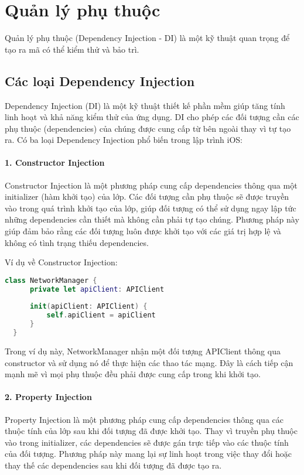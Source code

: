 \section{Quản lý phụ thuộc}
Quản lý phụ thuộc (Dependency Injection - DI) là một kỹ thuật quan trọng để tạo ra mã có thể kiểm thử và bảo trì.

\subsection{Các loại Dependency Injection}

Dependency Injection (DI) là một kỹ thuật thiết kế phần mềm giúp tăng tính linh hoạt và khả năng kiểm thử của ứng dụng. DI cho phép các đối tượng cần các phụ thuộc (dependencies) của chúng được cung cấp từ bên ngoài thay vì tự tạo ra. Có ba loại Dependency Injection phổ biến trong lập trình iOS:

\paragraph*{1. Constructor Injection}
Constructor Injection là một phương pháp cung cấp dependencies thông qua một initializer (hàm khởi tạo) của lớp. Các đối tượng cần phụ thuộc sẽ được truyền vào trong quá trình khởi tạo của lớp, giúp đối tượng có thể sử dụng ngay lập tức những dependencies cần thiết mà không cần phải tự tạo chúng. Phương pháp này giúp đảm bảo rằng các đối tượng luôn được khởi tạo với các giá trị hợp lệ và không có tình trạng thiếu dependencies.

Ví dụ về Constructor Injection:

\begin{lstlisting}[language=Swift]
  class NetworkManager {
      private let apiClient: APIClient
  
      init(apiClient: APIClient) {
          self.apiClient = apiClient
      }
  }
  \end{lstlisting}
  
Trong ví dụ này, NetworkManager nhận một đối tượng APIClient thông qua constructor và sử dụng nó để thực hiện các thao tác mạng. Đây là cách tiếp cận mạnh mẽ vì mọi phụ thuộc đều phải được cung cấp trong khi khởi tạo.
\paragraph*{2. Property Injection}
Property Injection là một phương pháp cung cấp dependencies thông qua các thuộc tính của lớp sau khi đối tượng đã được khởi tạo. Thay vì truyền phụ thuộc vào trong initializer, các dependencies sẽ được gán trực tiếp vào các thuộc tính của đối tượng. Phương pháp này mang lại sự linh hoạt trong việc thay đổi hoặc thay thế các dependencies sau khi đối tượng đã được tạo ra.

